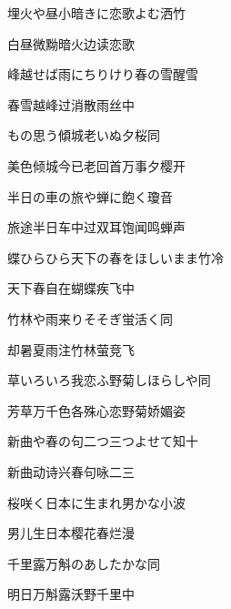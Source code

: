 \begin{haiku}
    {\FH 埋火や昼小暗きに恋歌よむ}\hfill{\FH 洒竹}

    {\FK 白昼微黝暗火边读恋歌}
\end{haiku}

\begin{haiku}
    {\FH 峰越せば雨にちりけり春の雪}\hfill{\FH 醒雪}

    {\FK 春雪越峰过消散雨丝中}
\end{haiku}

\begin{haiku}
    {\FH もの思う傾城老いぬ夕桜}\hfill{\FH 同}

    {\FK 美色倾城今已老回首万事夕樱开}
\end{haiku}

\begin{haiku}
    {\FH 半日の車の旅や蝉に飽く}\hfill{\FH 瓊音}

    {\FK 旅途半日车中过双耳饱闻鸣蝉声}
\end{haiku}

\begin{haiku}
    {\FH 蝶ひらひら天下の春をほしいまま}\hfill{\FH 竹冷}

    {\FK 天下春自在蝴蝶疾飞中}
\end{haiku}

\begin{haiku}
    {\FH 竹林や雨来りそそぎ蛍活く}\hfill{\FH 同}

    {\FK 却暑夏雨注竹林萤竞飞}
\end{haiku}

\begin{haiku}
    {\FH 草いろいろ我恋ふ野菊しほらしや}\hfill{\FH 同}

    {\FK 芳草万千色各殊心恋野菊娇媚姿}
\end{haiku}

\begin{haiku}
    {\FH 新曲や春の句二つ三つよせて}\hfill{\FH 知十}

    {\FK 新曲动诗兴春句咏二三}
\end{haiku}

\begin{haiku}
    {\FH 桜咲く日本に生まれ男かな}\hfill{\FH 小波}

    {\FK 男儿生日本樱花春烂漫}
\end{haiku}

\begin{haiku}
    {\FH {}千里露万斛のあしたかな}\hfill{\FH 同}

    {\FK 明日万斛露沃野千里中}
\end{haiku}

